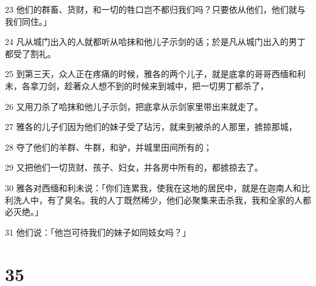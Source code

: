 \par 23 他们的群畜、货财，和一切的牲口岂不都归我们吗？只要依从他们，他们就与我们同住。」
\par 24 凡从城门出入的人就都听从哈抹和他儿子示剑的话；於是凡从城门出入的男丁都受了割礼。
\par 25 到第三天，众人正在疼痛的时候，雅各的两个儿子，就是底拿的哥哥西缅和利未，各拿刀剑，趁著众人想不到的时候来到城中，把一切男丁都杀了，
\par 26 又用刀杀了哈抹和他儿子示剑，把底拿从示剑家里带出来就走了。
\par 27 雅各的儿子们因为他们的妹子受了玷污，就来到被杀的人那里，掳掠那城，
\par 28 夺了他们的羊群、牛群，和驴，并城里田间所有的；
\par 29 又把他们一切货财、孩子、妇女，并各房中所有的，都掳掠去了。
\par 30 雅各对西缅和利未说：「你们连累我，使我在这地的居民中，就是在迦南人和比利洗人中，有了臭名。我的人丁既然稀少，他们必聚集来击杀我，我和全家的人都必灭绝。」
\par 31 他们说：「他岂可待我们的妹子如同妓女吗？」

\chapter{35}

